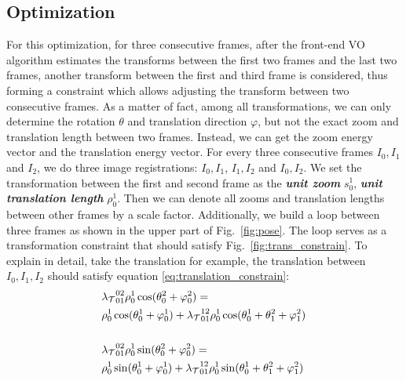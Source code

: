 \documentclass[letterpaper, 10 pt, conference]{ieeeconf}  %
\begin{document}
\subsection{Optimization}\label{sec:Opti}
For this optimization, for three consecutive frames, after the front-end VO algorithm estimates the transforms between the first two frames and the last two frames, another transform between the first and third frame is considered, thus forming a constraint which allows adjusting the transform between two consecutive frames.
As a matter of fact, among all transformations, we can only determine the rotation $\theta$ and translation direction $\varphi$, but not the exact zoom and translation length between two frames. Instead, we can get the zoom energy vector and the translation energy vector. For every three consecutive frames $I_0, I_1$ and $I_2$, we do three image registrations: $I_0, I_1$, $I_1, I_2$ and $I_0, I_2$.
We set the transformation between the first and second frame as the \textbf{\textit{unit zoom}} $s_0^1$, \textbf{\textit{unit translation length}} $\rho_0^1$. Then we can denote all zooms and translation lengths between other frames by a scale factor. Additionally, we build a loop between three frames as shown in the upper part of Fig.~\ref{fig:pose}. The loop serves as a  transformation constraint that should satisfy Fig.~\ref{fig:trans_constrain}. To explain in detail,
take the translation for example, the translation between $I_0, I_1, I_2$ should satisfy equation \ref{eq:translation_constrain}:
\begin{equation}
    \centering
    \begin{aligned}
        &{\lambda_{\mathcal{T}}}_{01}^{02}  \rho_0^1 \cos(\theta_0^2 + \varphi_0^2) = \\
        &\rho_0^1 \cos(\theta_0^1 + \varphi_0^1) + {\lambda_{\mathcal{T}}}_{01}^{12}  \rho_0^1 \cos(\theta_0^1 + \theta_1^2 + \varphi_1^2) \\ \\
        &{\lambda_{\mathcal{T}}}_{01}^{02}  \rho_0^1 \sin(\theta_0^2 + \varphi_0^2) =  \\
        &\rho_0^1 \sin(\theta_0^1 + \varphi_0^1) + {\lambda_{\mathcal{T}}}_{01}^{12}  \rho_0^1 \sin(\theta_0^1 + \theta_1^2 + \varphi_1^2) \\ 
    \end{aligned}
    \label{eq:translation_constrain}
\end{equation}
\end{document}
